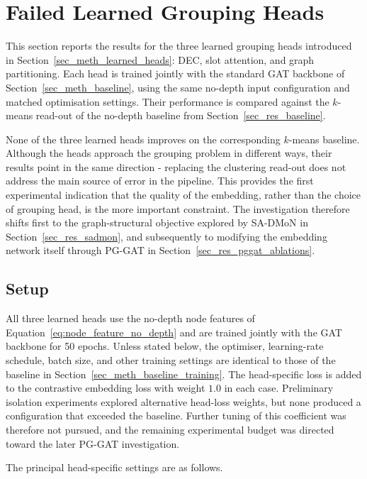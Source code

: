 \section{Failed Learned Grouping Heads}
\label{sec_res_learned_heads}

This section reports the results for the three learned grouping heads
introduced in Section~\ref{sec_meth_learned_heads}:
DEC,
slot attention,
and graph partitioning.
Each head is trained jointly with the standard GAT backbone
of Section~\ref{sec_meth_baseline},
using the same no-depth input configuration
and matched optimisation settings.
Their performance is compared against the $k$-means read-out
of the no-depth baseline from Section~\ref{sec_res_baseline}.

None of the three learned heads improves on the corresponding
$k$-means baseline.
Although the heads approach the grouping problem in different ways,
their results point in the same direction -
replacing the clustering read-out does not address the main source
of error in the pipeline.
This provides the first experimental indication that the quality
of the embedding,
rather than the choice of grouping head,
is the more important constraint.
The investigation therefore shifts first to the graph-structural
objective explored by SA-DMoN in Section~\ref{sec_res_sadmon},
and subsequently to modifying the embedding network itself
through PG-GAT in Section~\ref{sec_res_pggat_ablations}.

\subsection{Setup}
\label{sec_res_learned_heads_setup}

All three learned heads use the no-depth node features of
Equation~\eqref{eq:node_feature_no_depth}
and are trained jointly with the GAT backbone for 50 epochs.
Unless stated below,
the optimiser,
learning-rate schedule,
batch size,
and other training settings are identical to those of the baseline
in Section~\ref{sec_meth_baseline_training}.
The head-specific loss is added to the contrastive embedding loss
with weight $1.0$ in each case.
Preliminary isolation experiments explored alternative head-loss weights,
but none produced a configuration that exceeded the baseline.
Further tuning of this coefficient was therefore not pursued,
and the remaining experimental budget was directed toward the later
PG-GAT investigation.

The principal head-specific settings are as follows.


